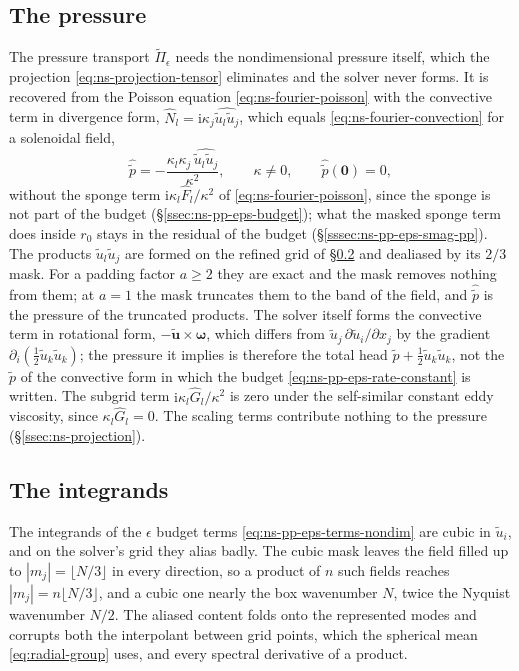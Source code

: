 \documentclass{article}
\begin{document}
\subsection{The pressure}\label{ssec:radial-pressure}
The pressure transport $\tilde \Pi_\epsilon$ needs the nondimensional pressure
itself, which the projection \eqref{eq:ns-projection-tensor} eliminates and
the solver never forms. It is recovered from the Poisson equation
\eqref{eq:ns-fourier-poisson} with the convective term in divergence form,
$\hat N_l = \mathrm{i} \kappa_j \widehat{\tilde u_l \tilde u_j}$, which equals
\eqref{eq:ns-fourier-convection} for a solenoidal field,
\begin{equation}\label{eq:radial-pressure}
  \hat{\tilde p} = -\frac{\kappa_l \kappa_j\, \widehat{\tilde u_l \tilde u_j}}{\kappa^2},
  \qquad \kappa \ne 0,
  \qquad \hat{\tilde p}(\mathbf{0}) = 0,
\end{equation}
without the sponge term $\mathrm{i} \kappa_l \hat F_l / \kappa^2$ of
\eqref{eq:ns-fourier-poisson}, since the sponge is not part of the budget
(\S\ref{ssec:ns-pp-eps-budget}); what the masked sponge term does inside
$r_0$ stays in the residual of the budget (\S\ref{sssec:ns-pp-eps-smag-pp}).
The products $\tilde u_l \tilde u_j$ are
formed on the refined grid of \S\ref{ssec:radial-integrands} and dealiased by
its $2/3$ mask. For a padding factor $a \ge 2$ they are exact and the mask
removes nothing from them; at $a = 1$ the mask truncates them to the band of
the field, and $\hat{\tilde p}$ is the pressure of the truncated products.
The solver itself forms the convective
term in rotational form, $-\tilde{\mathbf{u}} \times \boldsymbol{\omega}$,
which differs from $\tilde u_j\, \partial \tilde u_i / \partial x_j$ by the
gradient $\partial_i (\tfrac12 \tilde u_k \tilde u_k)$; the pressure it implies
is therefore the total head $\tilde p + \tfrac12 \tilde u_k \tilde u_k$, not
the $\tilde p$ of the convective form in which the budget
\eqref{eq:ns-pp-eps-rate-constant} is written. The subgrid term
$\mathrm{i} \kappa_l \hat G_l / \kappa^2$ is zero under the self-similar
constant eddy viscosity, since $\kappa_l \hat G_l = 0$. The scaling terms contribute nothing to the pressure
(\S\ref{ssec:ns-projection}).

\subsection{The integrands}\label{ssec:radial-integrands}
The integrands of the $\epsilon$ budget terms
\eqref{eq:ns-pp-eps-terms-nondim} are cubic in $\tilde u_i$, and on the
solver's grid they alias badly. The cubic mask leaves the field filled up to
$|m_j| = \lfloor N/3 \rfloor$ in every direction, so a product of $n$ such
fields reaches $|m_j| = n \lfloor N/3 \rfloor$, and a cubic one nearly the box
wavenumber $N$, twice the Nyquist wavenumber $N/2$. The aliased content folds
onto the represented modes and corrupts both the interpolant between grid
points, which the spherical mean \eqref{eq:radial-group} uses, and every
spectral derivative of a product.
\end{document}
